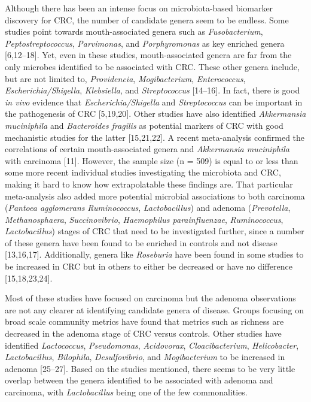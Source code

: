 \documentclass[12pt,]{article}
\begin{document}
Although there has been an intense focus on microbiota-based biomarker
discovery for CRC, the number of candidate genera seem to be endless.
Some studies point towards mouth-associated genera such as
\emph{Fusobacterium}, \emph{Peptostreptococcus}, \emph{Parvimonas}, and
\emph{Porphyromonas} as key enriched genera {[}6,12--18{]}. Yet, even in
these studies, mouth-associated genera are far from the only microbes
identified to be associated with CRC. These other genera include, but
are not limited to, \emph{Providencia}, \emph{Mogibacterium},
\emph{Enterococcus}, \emph{Escherichia/Shigella}, \emph{Klebsiella}, and
\emph{Streptococcus} {[}14--16{]}. In fact, there is good \emph{in vivo}
evidence that \emph{Escherichia/Shigella} and \emph{Streptococcus} can
be important in the pathogenesis of CRC {[}5,19,20{]}. Other studies
have also identified \emph{Akkermansia muciniphila} and
\emph{Bacteroides fragilis} as potential markers of CRC with good
mechanistic studies for the latter {[}15,21,22{]}. A recent
meta-analysis confirmed the correlations of certain mouth-associated
genera and \emph{Akkermansia muciniphila} with carcinoma {[}11{]}.
However, the sample size (n = 509) is equal to or less than some more
recent individual studies investigating the microbiota and CRC, making
it hard to know how extrapolatable these findings are. That particular
meta-analysis also added more potential microbial associations to both
carcinoma (\emph{Pantoea agglomerans} \emph{Ruminococcus},
\emph{Lactobacillus}) and adenoma (\emph{Prevotella},
\emph{Methanosphaera}, \emph{Succinovibrio}, \emph{Haemophilus
parainfluenzae}, \emph{Ruminococcus}, \emph{Lactobacillus}) stages of
CRC that need to be investigated further, since a number of these genera
have been found to be enriched in controls and not disease
{[}13,16,17{]}. Additionally, genera like \emph{Roseburia} have been
found in some studies to be increased in CRC but in others to either be
decreased or have no difference {[}15,18,23,24{]}.

Most of these studies have focused on carcinoma but the adenoma
observations are not any clearer at identifying candidate genera of
disease. Groups focusing on broad scale community metrics have found
that metrics such as richness are decreased in the adenoma stage of CRC
versus controls. Other studies have identified \emph{Lactococcus},
\emph{Pseudomonas}, \emph{Acidovorax}, \emph{Cloacibacterium},
\emph{Helicobacter}, \emph{Lactobacillus}, \emph{Bilophila},
\emph{Desulfovibrio}, and \emph{Mogibacterium} to be increased in
adenoma {[}25--27{]}. Based on the studies mentioned, there seems to be
very little overlap between the genera identified to be associated with
adenoma and carcinoma, with \emph{Lactobacillus} being one of the few
commonalities.
\end{document}
